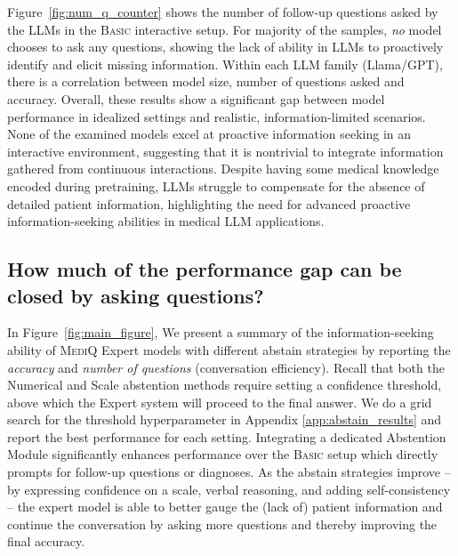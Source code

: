\documentclass{article}
\newcommand{\Fref}[1]{Figure~\ref{#1}}
\begin{document}
\Fref{fig:num_q_counter} shows the number of follow-up questions asked by the LLMs in the \textsc{Basic} interactive setup. 
For majority of the samples, \emph{no} model chooses to ask any questions, showing the lack of ability in LLMs to proactively identify and elicit missing information. 
Within each LLM family (Llama/GPT), there is a correlation between model size, number of questions asked and accuracy. 
Overall, these results show a significant gap between model performance in idealized settings and realistic, information-limited scenarios. None of the examined models excel at proactive information seeking in an interactive environment, suggesting that it is nontrivial to integrate information gathered from continuous interactions. 
Despite having some medical knowledge encoded during pretraining, LLMs struggle to compensate for the absence of detailed patient information, highlighting the need for advanced proactive information-seeking abilities in medical LLM applications.





\subsection{How much of the performance gap can be closed by asking questions?}
\label{sec:expert_results}\vspace{-1mm}


In \Fref{fig:main_figure}, We present a summary of the information-seeking ability of \textsc{MediQ} Expert models with different abstain strategies by reporting the \emph{accuracy} and \emph{number of questions} (conversation efficiency). Recall that both the Numerical and Scale abstention methods require setting a confidence threshold, above which the Expert system will proceed to the final answer. We do a grid search for the threshold hyperparameter in Appendix \ref{app:abstain_results} and report the best performance for each setting. 
Integrating a dedicated Abstention Module significantly enhances performance over the \textsc{Basic} setup which directly prompts for follow-up questions or diagnoses. 
As the abstain strategies improve -- by expressing confidence on a scale, verbal reasoning, and adding self-consistency -- the expert model is able to better gauge the (lack of) patient information and continue the conversation by asking more questions and thereby improving the final accuracy. 
\end{document}
